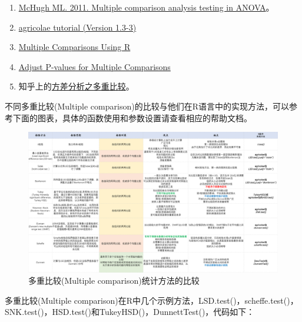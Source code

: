 \documentclass[
]{article}
\providecommand{\tightlist}{%
  \setlength{\itemsep}{0pt}\setlength{\parskip}{0pt}}
\begin{document}
\begin{enumerate}
\def\labelenumi{\arabic{enumi}.}
\tightlist
\item
  \href{https://www.biochemia-medica.com/en/journal/21/3/10.11613/BM.2011.029/fullArticle}{McHugh ML. 2011. Multiple comparison analysis testing in ANOVA}。
\item
  \href{https://cran.r-project.org/web/packages/agricolae/vignettes/tutorial.pdf}{agricolae tutorial (Version 1.3-3)}
\item
  \href{http://www.ievbras.ru/ecostat/Kiril/R/Biblio_N/R_Eng/Bretz2011.pdf}{Multiple Comparisons Using R}
\item
  \href{https://stat.ethz.ch/R-manual/R-devel/library/stats/html/p.adjust.html}{Adjust P-values for Multiple Comparisons}
\item
  知乎上的\href{https://zhuanlan.zhihu.com/p/44880434}{方差分析之多重比较}。
\end{enumerate}

不同多重比较(Multiple comparison)的比较与他们在R语言中的实现方法，可以参考下面的图表，具体的函数使用和参数设置请查看相应的帮助文档。

\begin{figure}

{\centering \includegraphics[width=0.95\linewidth]{image/PostHocMethodandR} 

}

\caption{多重比较(Multiple comparison)统计方法的比较}\label{fig:PostHocMethod}
\end{figure}

多重比较(Multiple comparison)在R中几个示例方法，LSD.test()，scheffe.test()，SNK.test()，HSD.test()和TukeyHSD()，DunnettTest()，代码如下：
\end{document}

